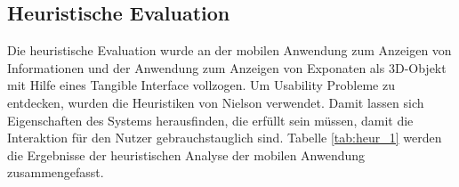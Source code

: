 \documentclass[runningheads,a4paper]{llncs}
\begin{document}






\subsection{Heuristische Evaluation}
Die heuristische Evaluation wurde an der mobilen Anwendung zum Anzeigen von Informationen und der Anwendung zum Anzeigen von Exponaten als 3D-Objekt mit Hilfe eines Tangible Interface vollzogen. Um Usability Probleme zu entdecken, wurden die Heuristiken von Nielson verwendet. Damit lassen sich Eigenschaften des Systems herausfinden, die erfüllt sein müssen, damit die Interaktion für den Nutzer gebrauchstauglich sind.
Tabelle \ref{tab:heur_1} werden die Ergebnisse der heuristischen Analyse der mobilen Anwendung zusammengefasst.
\end{document}
